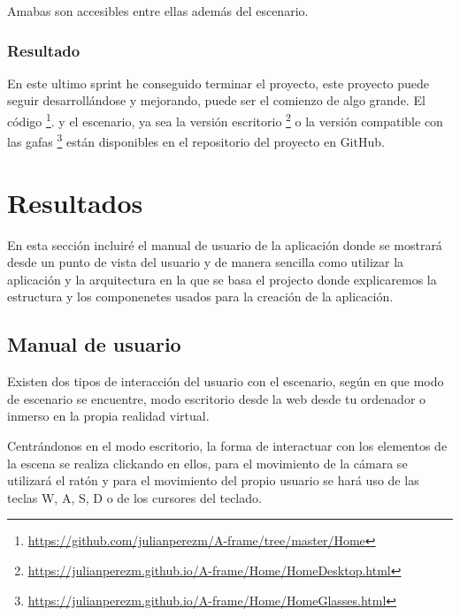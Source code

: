 \documentclass[a4paper, 12pt]{book}
\begin{document}
Amabas son accesibles entre ellas además del escenario.

\subsection{Resultado}

En este ultimo sprint he conseguido terminar el proyecto, este proyecto puede seguir desarrollándose y mejorando, puede ser el comienzo de algo grande. El código \footnote{\url{https://github.com/julianperezm/A-frame/tree/master/Home}}.  y el escenario, ya sea la versión escritorio \footnote{\url{https://julianperezm.github.io/A-frame/Home/HomeDesktop.html}} o la versión compatible con las gafas \footnote{\url{https://julianperezm.github.io/A-frame/Home/HomeGlasses.html}} están disponibles en el repositorio del proyecto en GitHub.


\cleardoublepage
\chapter{Resultados}

En esta sección incluiré el manual de usuario de la aplicación donde se mostrará  desde un punto de vista del usuario y de  manera sencilla como utilizar la aplicación y la arquitectura en la que se basa el projecto donde explicaremos la estructura y los componenetes usados para la creación de la aplicación.

\section{Manual de usuario} 
\label{sec:manual de usuario}

Existen dos tipos de interacción del usuario con el escenario, según en que modo de escenario se encuentre, modo escritorio desde la web desde tu ordenador  o inmerso en la propia realidad virtual.

Centrándonos en el modo escritorio, la forma de interactuar con los elementos de la escena se realiza clickando en ellos, para el movimiento de la cámara se utilizará el ratón y para el movimiento del propio usuario se hará uso de las teclas W, A, S, D o de los cursores del teclado. 
\end{document}
